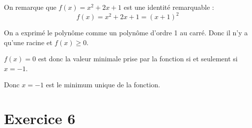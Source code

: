 \documentclass[9pt,professionalfonts,handout,hyperref]{beamer}
\begin{document}
%
%
\begin{frame}
	
\pause On remarque que $f(x) = x^2+2x+1$ est une identité remarquable : \pause $$f(x) = x^2+2x+1= (x+1)^2$$


\pause On a exprimé le polynôme comme un polynôme d'ordre 1 au carré. \pause Donc il n'y a qu'une racine et $f(x)\ge0$. \newline 

\pause $f(x)=0$ est donc la valeur minimale prise par la fonction si et seulement si $x=-1$. \newline 

\pause Donc $x=-1$ est le minimum unique de la fonction. 
	
\end{frame}


\section{Exercice 6}

%
%
\end{document}
